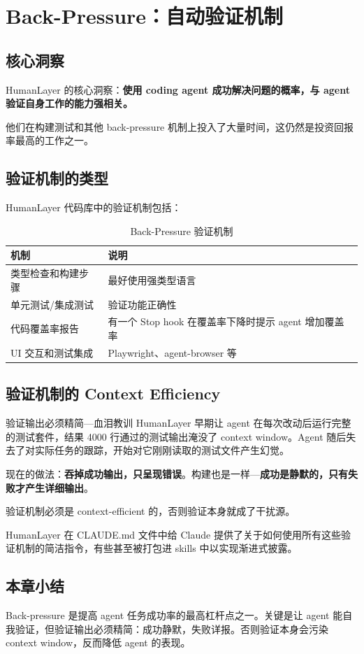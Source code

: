 \section{Back-Pressure：自动验证机制}

\subsection{核心洞察}

HumanLayer 的核心洞察：\textbf{使用 coding agent 成功解决问题的概率，与 agent 验证自身工作的能力强相关。}

他们在构建测试和其他 back-pressure 机制上投入了大量时间，这仍然是投资回报率最高的工作之一。

\subsection{验证机制的类型}

HumanLayer 代码库中的验证机制包括：

\begin{table}[H]
\centering
\caption{Back-Pressure 验证机制}
\begin{tabular}{@{}p{4cm}p{9cm}@{}}
\toprule
\textbf{机制} & \textbf{说明} \\
\midrule
类型检查和构建步骤 & 最好使用强类型语言 \\
单元测试/集成测试 & 验证功能正确性 \\
代码覆盖率报告 & 有一个 Stop hook 在覆盖率下降时提示 agent 增加覆盖率 \\
UI 交互和测试集成 & Playwright、agent-browser 等 \\
\bottomrule
\end{tabular}
\end{table}

\subsection{验证机制的 Context Efficiency}

\begin{warningbox}{验证输出必须精简---血泪教训}
HumanLayer 早期让 agent 在每次改动后运行完整的测试套件，结果 4000 行通过的测试输出淹没了 context window。Agent 随后失去了对实际任务的跟踪，开始对它刚刚读取的测试文件产生幻觉。

现在的做法：\textbf{吞掉成功输出，只呈现错误}。构建也是一样---\textbf{成功是静默的，只有失败才产生详细输出}。

验证机制必须是 context-efficient 的，否则验证本身就成了干扰源。
\end{warningbox}

HumanLayer 在 CLAUDE.md 文件中给 Claude 提供了关于如何使用所有这些验证机制的简洁指令，有些甚至被打包进 skills 中以实现渐进式披露。

\subsection{本章小结}

Back-pressure 是提高 agent 任务成功率的最高杠杆点之一。关键是让 agent 能自我验证，但验证输出必须精简：成功静默，失败详报。否则验证本身会污染 context window，反而降低 agent 的表现。


